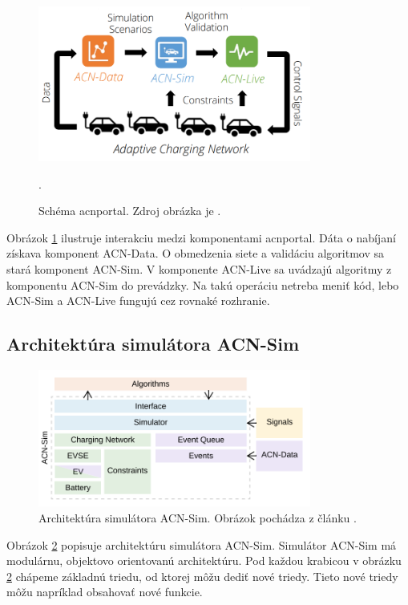 \begin{figure}[H]
    \includegraphics[width=0.8\textwidth]{images/acn_research_portal_pic.png}
    \centering
    \caption[Schéma acnportal.]{Schéma acnportal. Zdroj obrázka je \cite{lee2021acnsim}.}.
    \label{acn:obr}
    \end{figure}
Obrázok \ref{acn:obr} ilustruje interakciu medzi komponentami acnportal. Dáta o nabíjaní získava komponent ACN-Data. O obmedzenia siete a validáciu algoritmov sa stará komponent ACN-Sim. V komponente ACN-Live sa uvádzajú algoritmy z komponentu ACN-Sim do prevádzky. Na takú operáciu netreba meniť kód, lebo ACN-Sim a ACN-Live fungujú cez rovnaké rozhranie. \cite{lee2021acnsim,lee2021adaptivephd}





\subsection{Architektúra simulátora ACN-Sim}

\begin{figure}[H]
    \includegraphics[width=0.8\textwidth]{images/acn_architecture.png}
    \centering
    \caption[Architektúra simulátora ACN-Sim.]{Architektúra simulátora ACN-Sim. Obrázok pochádza z článku \cite{lee2021acnsim}.}
    \label{architectureacnsim+:obr2}
    \end{figure}
Obrázok \ref{architectureacnsim+:obr2} popisuje architektúru simulátora ACN-Sim. Simulátor ACN-Sim má modulárnu, objektovo orientovanú architektúru. Pod každou krabicou v obrázku \ref{architectureacnsim+:obr2} chápeme základnú triedu, od ktorej môžu dediť nové triedy. Tieto nové triedy môžu napríklad obsahovať nové funkcie.  


